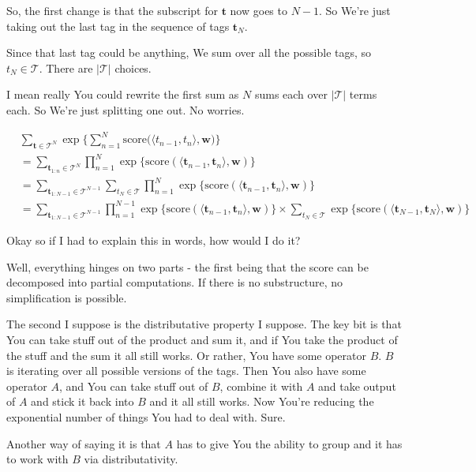 \documentclass{article}
\begin{document}
	So, the first change is that the subscript for $\mathbf{t}$ now goes to $N-1$. So We're just taking out the last tag in the sequence of tags $\mathbf{t}_N$.
	
	Since that last tag could be anything, We sum over all the possible tags, so $t_N\in\mathcal{T}$. There are $|\mathcal{T}|$ choices.
	
	I mean really You could rewrite the first sum as $N$ sums each over $|\mathcal{T}|$ terms each. So We're just splitting one out. No worries.
	
	\begin{align}
		&\sum_{\mathbf{t}\in\mathcal{T}^N} \exp\bigg\{ \sum^N_{n=1} \text{score}\big( \langle t_{n-1}, t_n \rangle, \mathbf{w} \big) \bigg\}\\
		&= \sum_{\mathbf{t}_{1:n}\in\mathcal{T}^N} \prod^N_{n=1} \exp \big\{ \text{score}(\langle \mathbf{t}_{n-1}, \mathbf{t}_n \rangle, \mathbf{w}) \big\}\\
		&= \sum_{\mathbf{t}_{1:N-1}\in\mathcal{T}^{N-1}} \sum_{t_N\in \mathcal{T}} \prod^N_{n=1} \exp \big\{ \text{score}(\langle \mathbf{t}_{n-1}, \mathbf{t}_n \rangle, \mathbf{w}) \big\}\\
		&= \sum_{\mathbf{t}_{1:N-1}\in\mathcal{T}^{N-1}} \prod^{N-1}_{n=1} \exp \big\{ \text{score}(\langle \mathbf{t}_{n-1}, \mathbf{t}_n \rangle, \mathbf{w}) \big\} \times \sum_{t_N\in\mathcal{T}} \exp \big\{ \text{score}(\langle \mathbf{t}_{N-1}, \mathbf{t}_N \rangle, \mathbf{w}) \big\}
	\end{align}	
	
	Okay so if I had to explain this in words, how would I do it?
	
	Well, everything hinges on two parts - the first being that the score can be decomposed into partial computations. If there is no substructure, no simplification is possible. 
	
	The second I suppose is the distributative property I suppose. The key bit is that You can take stuff out of the product and sum it, and if You take the product of the stuff and the sum it all still works. Or rather, You have some operator $B$. $B$ is iterating over all possible versions of the tags. Then You also have some operator $A$, and You can take stuff out of $B$, combine it with $A$ and take output of $A$ and stick it back into $B$ and it all still works. Now You're reducing the exponential number of things You had to deal with. Sure.
	
	Another way of saying it is that $A$ has to give You the ability to group and it has to work with $B$ via distributativity.
	
\end{document}
